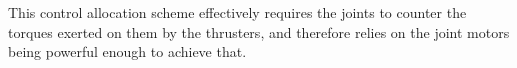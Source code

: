 \documentclass[../main.tex]{subfiles}
\begin{document}

\begin{remark}
    This control allocation scheme effectively requires the joints to counter the torques exerted on them by the thrusters, and therefore relies on the joint motors being powerful enough to achieve that.
\end{remark}



\vspace{-10pt}
\end{document}

